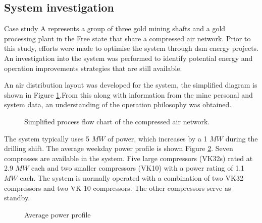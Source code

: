 \subsection{System investigation}
Case study A represents a group of three gold mining shafts and a gold processing plant in the Free state that share a compressed air network. Prior to this study, efforts were made to optimise the system through \gls{dsm} energy projects. An investigation into the system was performed to identify potential energy and operation improvements strategies that are still available.
\par 
An air distribution layout was developed for the system, the simplified diagram is shown in Figure \ref{fig: Beatrix Air layout}.From this along with information from the mine personal and system data, an understanding of the operation philosophy was obtained. 
\par 
\begin{figure}[h!]
	\centering
	\caption{Simplified process flow chart of the compressed air network.}
	\label{fig: Beatrix Air layout}
\end{figure}

The system typically uses 5 $MW$ of power, which increases by a 1 $MW$ during the drilling shift. The average weekday power profile is shown Figure \ref{fig: Beatrix power baseline}. Seven compresses are available in the system. Five large compressors (VK32s) rated at 2.9 $MW$ each and two smaller compressors (VK10) with a power rating of 1.1 $MW$ each. The system is normally operated with a combination of two VK32 compressors and two VK 10 compressors. The other compressors serve as standby. 
\begin{figure}[h!]
	\centering
	
	\caption{Average power profile}
	\label{fig: Beatrix power baseline}
\end{figure}

